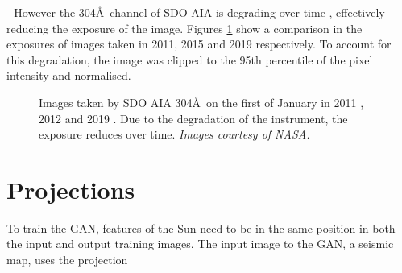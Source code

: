 \documentclass[11pt,a4paper,onecolumn]{report}
\begin{document}
 - However the 304\AA \ channel of SDO AIA is degrading over time
 \cite{boerner_photometric_2014}, effectively reducing the exposure of the
 image. Figures \ref{fig:aia_degradation} show a comparison in the exposures of
 images taken in 2011, 2015 and 2019 respectively. To account for this
 degradation, the image was clipped to the 95th percentile of the pixel
 intensity and normalised. 


 \begin{figure}[t]%
  \centering
  \qquad
  \qquad
  \caption[]{
    Images taken by SDO AIA 304\AA \ on the first of January in
    2011 , 2012  and 2019
    . Due to the degradation of the instrument, the
    exposure reduces over time. \textit{Images courtesy of NASA.}}
  \label{fig:aia_degradation}
\end{figure}





\section{Projections}
To train the GAN, features of the Sun need to be in the same position in both
the input and output training images.
The input image to the GAN, a seismic map, uses the projection
\end{document}
